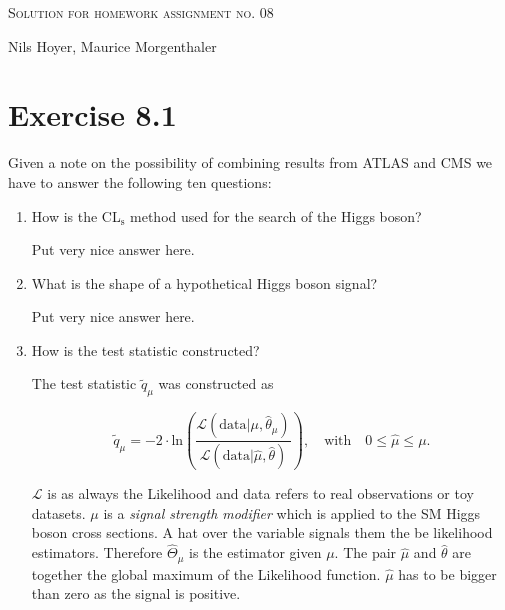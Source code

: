 \documentclass[10pt]{article}
\newenvironment{myfont}{\fontfamily{put}\selectfont}{\par}
\newcommand{\testStat}{\tilde{q}_{\mu}}
\begin{document}
\begin{myfont}

\begin{center}
  \begin{Large}
    \textsc{Solution for homework assignment no. 08} \\
  \end{Large}
	\vspace*{0.4cm}
    Nils Hoyer, Maurice Morgenthaler
  \vspace*{1cm}
\end{center}

\section*{Exercise 8.1}

Given a note on the possibility of combining results from ATLAS and CMS we have to answer the following ten questions:

\begin{enumerate}
  \item How is the CL$_{\textrm{s}}$ method used for the search of the Higgs boson?

  \noindent Put very nice answer here.

  \item What is the shape of a hypothetical Higgs boson signal?

  \noindent Put very nice answer here.

  \item How is the test statistic constructed?

  \noindent The test statistic $\testStat$ was constructed as 
  
  \begin{equation}
      \testStat = -2 \cdot \textrm{ln} \left(\frac{\mathcal{L}\left(\textrm{data}|\mu, \hat{\theta}_{\mu}\right)}{\mathcal{L}\left(\textrm{data}|\hat{\mu}, \hat{\theta}\right)}\right), \quad \textrm{with} \quad 0 \leq \hat{\mu} \leq \mu.
  \end{equation}
	
	\noindent $\mathcal{L}$ is as always the Likelihood and data refers to real observations or toy datasets. 
	$\mu$ is a \textit{signal strength modifier} which is applied to the SM Higgs boson cross sections. 
	A hat over the variable signals them the be likelihood estimators. 
	Therefore $\hat{\Theta}_{\mu}$ is the estimator given $\mu$. 
	The pair $\hat{\mu}$ and $\hat{\theta}$ are together the global maximum of the Likelihood function. 
	$\hat{\mu}$ has to be bigger than zero as the signal is positive. 


\end{enumerate}
\end{myfont}
\end{document}
